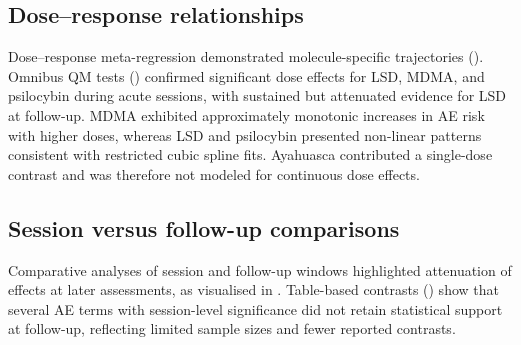 
\subsection{Dose--response relationships}
Dose--response meta-regression demonstrated molecule-specific trajectories (). Omnibus QM tests () confirmed significant dose effects for LSD, MDMA, and psilocybin during acute sessions, with sustained but attenuated evidence for LSD at follow-up. MDMA exhibited approximately monotonic increases in AE risk with higher doses, whereas LSD and psilocybin presented non-linear patterns consistent with restricted cubic spline fits. Ayahuasca contributed a single-dose contrast and was therefore not modeled for continuous dose effects.


\subsection{Session versus follow-up comparisons}
Comparative analyses of session and follow-up windows highlighted attenuation of effects at later assessments, as visualised in . Table-based contrasts () show that several AE terms with session-level significance did not retain statistical support at follow-up, reflecting limited sample sizes and fewer reported contrasts.

